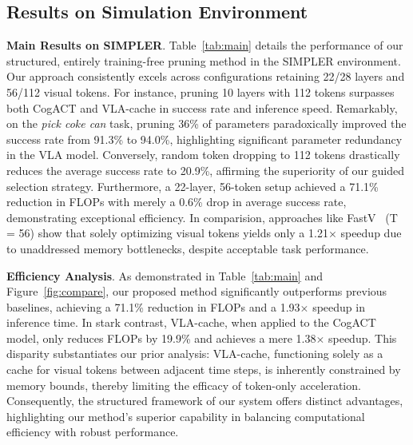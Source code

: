 \subsection{Results on Simulation Environment}


\noindent \textbf{Main Results on SIMPLER}.
Table~\ref{tab:main} details the performance of our structured, entirely training-free pruning method in the SIMPLER environment. Our approach consistently excels across configurations retaining 22/28 layers and 56/112 visual tokens. For instance, pruning 10 layers with 112 tokens surpasses both CogACT and VLA-cache in success rate and inference speed. Remarkably, on the \emph{pick coke can} task, pruning 36\% of parameters paradoxically improved the success rate from 91.3\% to 94.0\%, highlighting significant parameter redundancy in the VLA model. Conversely, random token dropping to 112 tokens drastically reduces the average success rate to 20.9\%, affirming the superiority of our guided selection strategy. Furthermore, a 22-layer, 56-token setup achieved a 71.1\% reduction in FLOPs with merely a 0.6\% drop in average success rate, demonstrating exceptional efficiency. In comparision, approaches like FastV~\citep{chen2025image} (T = 56) show that solely optimizing visual tokens yields only a 1.21$\times$ speedup due to unaddressed memory bottlenecks, despite acceptable task performance.


\noindent \textbf{Efficiency Analysis}.
As demonstrated in Table~\ref{tab:main} and Figure~\ref{fig:compare}, our proposed method significantly outperforms previous baselines, achieving a 71.1\% reduction in FLOPs and a 1.93$\times$ speedup in inference time. In stark contrast, VLA-cache, when applied to the CogACT model, only reduces FLOPs by 19.9\% and achieves a mere 1.38$\times$ speedup. This disparity substantiates our prior analysis: VLA-cache, functioning solely as a cache for visual tokens between adjacent time steps, is inherently constrained by memory bounds, thereby limiting the efficacy of token-only acceleration. Consequently, the structured framework of our system offers distinct advantages, highlighting our method's superior capability in balancing computational efficiency with robust performance.



